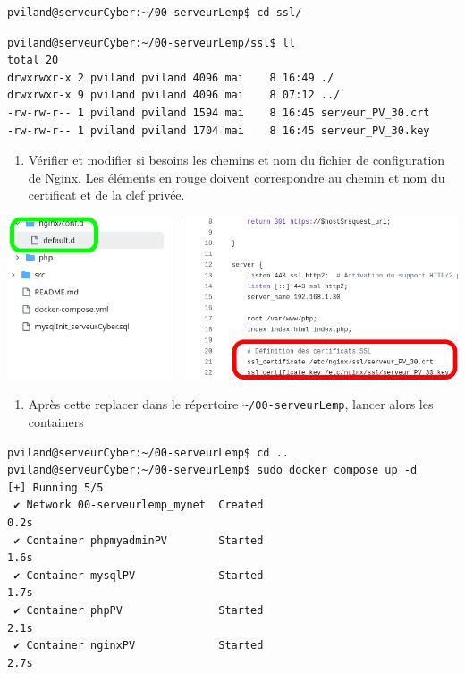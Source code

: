 \documentclass[french, 12pt]{article}%
\begin{document}
\begin{lstlisting}[style=commande]
pviland@serveurCyber:~/00-serveurLemp$ cd ssl/
\end{lstlisting}

\begin{lstlisting}[style=commande]
pviland@serveurCyber:~/00-serveurLemp/ssl$ ll
total 20
drwxrwxr-x 2 pviland pviland 4096 mai    8 16:49 ./
drwxrwxr-x 9 pviland pviland 4096 mai    8 07:12 ../
-rw-rw-r-- 1 pviland pviland 1594 mai    8 16:45 serveur_PV_30.crt
-rw-rw-r-- 1 pviland pviland 1704 mai    8 16:45 serveur_PV_30.key
\end{lstlisting}

\begin{enumerate}[resume]
\item Vérifier et modifier si besoins les chemins et nom du fichier de configuration de Nginx. Les éléments en rouge doivent correspondre au chemin et nom du certificat et de la clef privée.
\end{enumerate}

\begin{center}
\includegraphics[scale=0.5]{./ressource/modifFichierNginxHttps}
\end{center}

\begin{enumerate}[resume]
\item Après cette replacer dans le répertoire \verb?~/00-serveurLemp?,  lancer alors les containers 
\end{enumerate}

\begin{lstlisting}[style=commande]
pviland@serveurCyber:~/00-serveurLemp$ cd ..
pviland@serveurCyber:~/00-serveurLemp$ sudo docker compose up -d
[+] Running 5/5
 ✔ Network 00-serveurlemp_mynet  Created                                   0.2s 
 ✔ Container phpmyadminPV        Started                                   1.6s 
 ✔ Container mysqlPV             Started                                   1.7s 
 ✔ Container phpPV               Started                                   2.1s 
 ✔ Container nginxPV             Started                                   2.7s 
\end{lstlisting}
\end{document}
